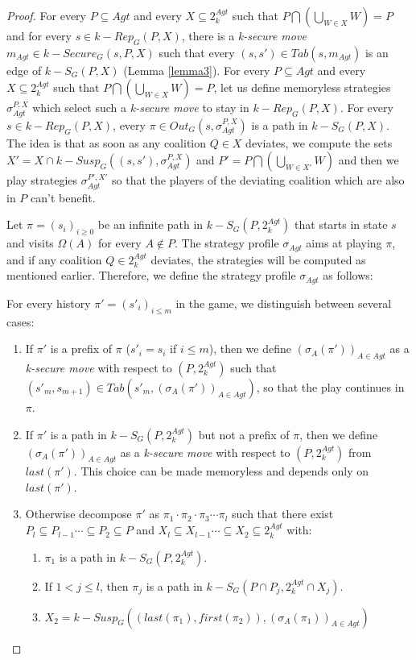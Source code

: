 \begin{proof}
For every $P \subseteq Agt$ and every $X \subseteq 2^{Agt}_{k}$ such that $P \bigcap \left( \bigcup \limits_{W \in X}W \right) = P$ and for every $s \in k-Rep_{G}(P, X)$, there is a \textit{k-secure move} $m_{Agt} \in k-Secure_{G}(s, P, X)$ such that every $(s, s') \in Tab(s, m_{Agt})$ is an edge of $k-S_{G}(P, X)$ (Lemma \ref{lemma3}). For every $P \subseteq Agt$ and every $X \subseteq 2^{Agt}_{k}$ such that $P \bigcap \left( \bigcup \limits_{W \in X}W \right) = P$, let us define memoryless strategies $\sigma_{Agt}^{P, X}$ which select such a \textit{k-secure move} to stay in $k-Rep_{G}(P, X)$. For every $s \in k-Rep_{G}(P, X)$, every $\pi \in Out_{G}(s, \sigma_{Agt}^{P, X})$ is a path in $k-S_{G}(P, X)$. The idea is that as soon as any coalition $Q \in X$ deviates, we compute the sets $X' = X \cap k-Susp_{G}((s, s'), \sigma_{Agt}^{P, X})$ and $P' = P \bigcap \left( \bigcup \limits_{W \in X'}W \right)$ and then we play strategies $\sigma_{Agt}^{P', X'}$ so that the players of the deviating coalition which are also in $P$ can't benefit.

Let $\pi = (s_{i})_{i\geq 0}$ be an infinite path in $k-S_{G}(P, 2^{Agt}_{k})$ that starts in state $s$ and visits $\Omega(A)$ for every $A \notin P$. The strategy profile $\sigma_{Agt}$ aims at playing $\pi$, and if any coalition $Q \in 2^{Agt}_{k}$ deviates, the strategies will be computed as mentioned earlier. Therefore, we define the strategy profile $\sigma_{Agt}$ as follows: 

For every history $\pi' = (s'_{i})_{i\leq m}$ in the game, we distinguish between several cases:
\begin{enumerate}
\item If $\pi'$ is a prefix of $\pi$ ($s'_{i} = s_{i}$ if $i \leq m$), then we define $(\sigma_{A}(\pi'))_{A\in Agt}$ as a \textit{k-secure move} with respect to $(P, 2^{Agt}_{k})$ such that $(s'_{m}, s_{m+1}) \in Tab(s'_{m}, (\sigma_{A}(\pi'))_{A\in Agt})$, so that the play continues in $\pi$.
\item If $\pi'$ is a path in $k-S_{G}(P, 2^{Agt}_{k})$ but not a prefix of $\pi$, then we define $(\sigma_{A}(\pi'))_{A\in Agt}$ as a \textit{k-secure move} with respect to $(P, 2^{Agt}_{k})$ from $last(\pi')$. This choice can be made memoryless and depends only on $last(\pi')$.
\item Otherwise decompose $\pi'$ as $\pi_{1} \cdot \pi_{2} \cdot \pi_{3} \cdots \pi_{l}$ such that there exist $P_{l} \subseteq P_{l-1} \cdots \subseteq P_{2} \subseteq P$ and $X_{l} \subseteq X_{l-1} \cdots \subseteq X_{2} \subseteq 2^{Agt}_{k}$ with:
\begin{enumerate}
\item $\pi_{1}$ is a path in $k-S_{G}(P, 2^{Agt}_{k})$.
\item If $1 < j \leq l$, then $\pi_{j}$ is a path in $k-S_{G}(P \cap P_{j}, 2^{Agt}_{k} \cap X_{j})$.
\item $X_{2} = k-Susp_{G}((last(\pi_{1}), first(\pi_{2})), (\sigma_{A}(\pi_{1}))_{A\in Agt})$


\end{enumerate}
\end{enumerate}
\end{proof}
